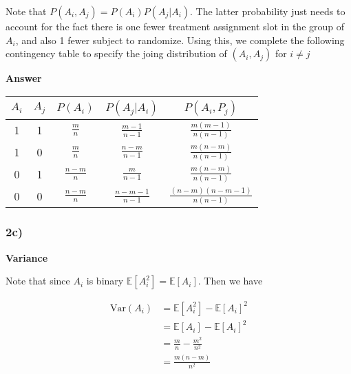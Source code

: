 \documentclass[
  11pt,
  letterpaper,
  DIV=11,
  numbers=noendperiod]{scrartcl}
\newcommand{\var}{\text{Var}}
\begin{document}
Note that \(P(A_i, A_j) = P(A_i)P(A_j|A_i)\). The latter probability
just needs to account for the fact there is one fewer treatment
assignment slot in the group of \(A_i\), and also 1 fewer subject to
randomize. Using this, we complete the following contingency table to
specify the joing distribution of \((A_i, A_j)\) for \(i \neq j\)

\begin{tcolorbox}[enhanced jigsaw, arc=.35mm, colback=white, bottomrule=.15mm, breakable, opacityback=0, rightrule=.15mm, toprule=.15mm, leftrule=.75mm, left=2mm, colframe=quarto-callout-note-color-frame]

\textbf{Answer}\vspace{2mm}

\begin{table}[h]
\centering
\begin{tabular}{c|c|c|c|c}
$A_i$ & $A_j$ & $P(A_i)$ & $P(A_j|A_i)$ & $P(A_i, P_j)$ \\
\hline
1 & 1 & $\frac{m}{n}$ & $\frac{m-1}{n-1}$ & $\frac{m(m-1)}{n(n-1)}$ \\
1 & 0 & $\frac{m}{n}$ & $\frac{n-m}{n-1}$ & $\frac{m(n-m)}{n(n-1)}$ \\
0 & 1 & $\frac{n-m}{n}$ & $\frac{m}{n-1}$ & $\frac{m(n-m)}{n(n-1)}$ \\
0 & 0 & $\frac{n-m}{n}$ & $\frac{n-m-1}{n-1}$ & $\frac{(n-m)(n-m-1)}{n(n-1)}$ 
\end{tabular}
\end{table}

\end{tcolorbox}

\hypertarget{c}{%
\subsubsection{2c)}\label{c}}

\begin{tcolorbox}[enhanced jigsaw, arc=.35mm, colback=white, bottomrule=.15mm, breakable, opacityback=0, rightrule=.15mm, toprule=.15mm, leftrule=.75mm, left=2mm, colframe=quarto-callout-note-color-frame]

\textbf{Variance}\vspace{2mm}

Note that since \(A_i\) is binary
\(\mathbb{E}[A_i^2] = \mathbb{E}[A_i]\). Then we have

\[
\begin{aligned}
\var(A_i) &= \mathbb{E}[A_i^2] - \mathbb{E}[A_i]^2 \\ 
&= \mathbb{E}[A_i] - \mathbb{E}[A_i]^2 \\ 
&= \frac{m}{n} - \frac{m^2}{n^2} \\ 
&= \frac{m(n-m)}{n^2}
\end{aligned}
\]

\end{tcolorbox}
\end{document}
